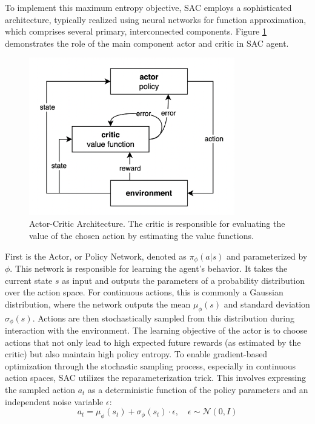 To implement this maximum entropy objective, \gls{SAC} employs a sophisticated architecture, typically realized using neural networks for function approximation, which comprises several primary, interconnected components. Figure \ref{fig:AC} demonstrates the role of the main component actor and critic in \gls{SAC} agent.

\begin{figure}
  \centering
  \includegraphics[width=0.8\textwidth]{images/AC_architecture.png}
  \caption{Actor-Critic Architecture. The critic is responsible for evaluating the value of the chosen action by estimating the value functions.}
  \label{fig:AC}
\end{figure}

First is the Actor, or Policy Network, denoted as \(\pi_\phi(a|s)\) and parameterized by \(\phi\). This network is responsible for learning the agent's behavior. It takes the current state \(s\) as input and outputs the parameters of a probability distribution over the action space. For continuous actions, this is commonly a Gaussian distribution, where the network outputs the mean \(\mu_\phi(s)\) and standard deviation \(\sigma_\phi(s)\). Actions are then stochastically sampled from this distribution during interaction with the environment. The  learning objective of the actor is to choose actions that not only lead to high expected future rewards (as estimated by the critic) but also maintain high policy entropy. To enable gradient-based optimization through the stochastic sampling process, especially in continuous action spaces, \gls{SAC} utilizes the reparameterization trick. This involves expressing the sampled action \(a_t\) as a deterministic function of the policy parameters and an independent noise variable \(\epsilon\):
\[a_t = \mu_\phi(s_t) + \sigma_\phi(s_t) \cdot \epsilon, \quad \epsilon \sim \mathcal{N}(0,I)\]

